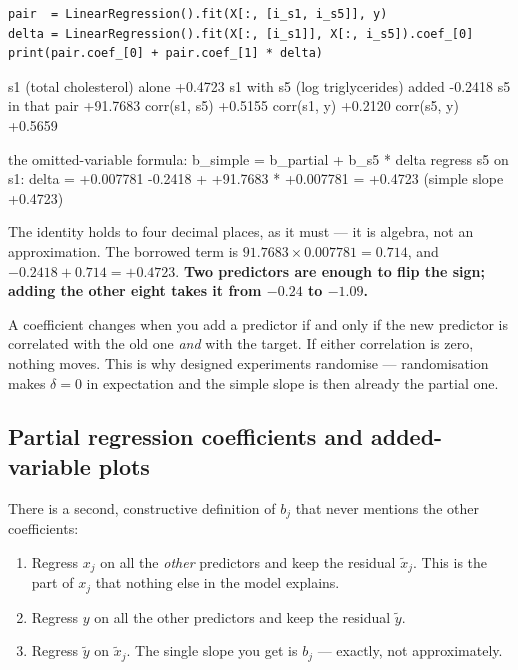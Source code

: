 \documentclass[11pt]{article}
\begin{document}
\begin{lstlisting}
pair  = LinearRegression().fit(X[:, [i_s1, i_s5]], y)
delta = LinearRegression().fit(X[:, [i_s1]], X[:, i_s5]).coef_[0]
print(pair.coef_[0] + pair.coef_[1] * delta)
\end{lstlisting}
\begin{codeout}
s1 (total cholesterol) alone            +0.4723
s1 with s5 (log triglycerides) added    -0.2418
s5 in that pair                         +91.7683
corr(s1, s5) +0.5155    corr(s1, y) +0.2120    corr(s5, y) +0.5659

the omitted-variable formula: b_simple = b_partial + b_s5 * delta
   regress s5 on s1: delta = +0.007781
   -0.2418 + +91.7683 * +0.007781 = +0.4723   (simple slope +0.4723)
\end{codeout}

The identity holds to four decimal places, as it must --- it is algebra, not
an approximation. The borrowed term is $91.7683 \times 0.007781 = 0.714$, and
$-0.2418 + 0.714 = +0.4723$. \textbf{Two predictors are enough to flip the
sign; adding the other eight takes it from $-0.24$ to $-1.09$.}

\begin{keyidea}
A coefficient changes when you add a predictor if and only if the new
predictor is correlated with the old one \emph{and} with the target. If either
correlation is zero, nothing moves. This is why designed experiments randomise
--- randomisation makes $\delta = 0$ in expectation and the simple slope is
then already the partial one.
\end{keyidea}

\subsection{Partial regression coefficients and added-variable plots}
\label{sec:fwl}

There is a second, constructive definition of $b_j$ that never mentions the
other coefficients:

\begin{enumerate}[leftmargin=*]
  \item Regress $x_j$ on all the \emph{other} predictors and keep the residual
    $\tilde x_j$. This is the part of $x_j$ that nothing else in the model
    explains.
  \item Regress $y$ on all the other predictors and keep the residual
    $\tilde y$.
  \item Regress $\tilde y$ on $\tilde x_j$. The single slope you get is
    $b_j$ --- exactly, not approximately.
\end{enumerate}
\end{document}

